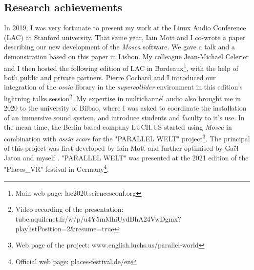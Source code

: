 \documentclass[journal,onecolumn]{IEEEtran}
\begin{document}
\subsection{Research achievements} %
In 2019, I was very fortunate to present my work \cite{keller:linux} at the Linux Audio Conference (LAC) at Stanford university. That same year, Iain Mott and I co-wrote a paper describing our new development of the \textit{Mosca} software. We gave a talk and a demonstration based on this paper\cite{mott:mosca} in Lisbon.  My colleague Jean-Michaël Celerier and I then hosted the following edition of LAC in Bordeaux\footnote{Main web page: lac2020.sciencesconf.org}, with the help of both public and private partners. Pierre Cochard and I introduced our integration of the \textit{ossia} library in the \textit{supercollider} environment in this edition's lightning talks session\footnote{Video recording of the presentation: tube.aquilenet.fr/w/p/u4Y5mMhiUydBhA24VwDgmx?playlistPosition=2\&resume=true}. 
My expertise in multichannel audio also brought me in 2020 to the university of Bilbao, where I was asked to coordinate the installation of an immersive sound system, and introduce students and faculty to it's use.
In the mean time, the Berlin based company LUCH.US started using \textit{Mosca} in combination with \textit{ossia score} for the "PARALLEL WELT" project\footnote{Web page of the project: www.english.luchs.us/parallel-world}. The principal of this project was first developed by Iain Mott \cite{mott:botanica} and further optimised by Gaël Jaton and myself \cite{jaton:moscanica}. "PARALLEL WELT" was presented at the 2021 edition of the "Places\_VR" festival in Germany\footnote{Official web page: places-festival.de/en}.
\end{document}
